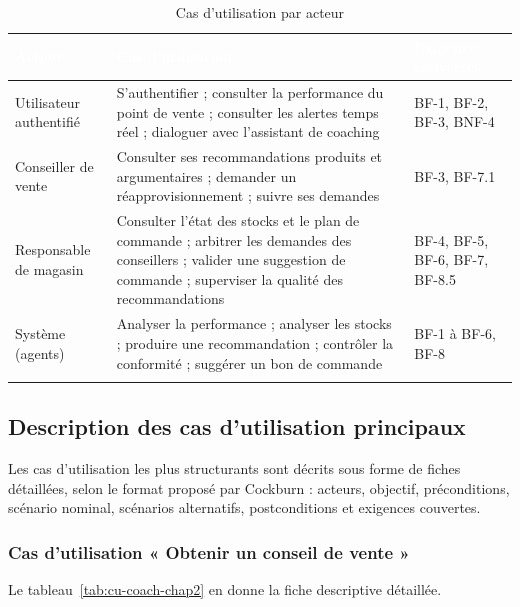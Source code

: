 \begin{longtable}{|P{3.2cm}|P{5.4cm}|P{5.4cm}|}
\hline
{}
\textcolor{white}{\textbf{Acteur}} &
\textcolor{white}{\textbf{Cas d'utilisation}} &
\textcolor{white}{\textbf{Exigences couvertes}} \\
\hline
\endhead
\hline
\endfoot
\hline
\endlastfoot
Utilisateur authentifié &
S'authentifier ; consulter la performance du point de vente ; consulter les alertes temps réel ; dialoguer avec l'assistant de coaching &
BF-1, BF-2, BF-3, BNF-4 \\
\hline
Conseiller de vente &
Consulter ses recommandations produits et argumentaires ; demander un réapprovisionnement ; suivre ses demandes &
BF-3, BF-7.1 \\
\hline
Responsable de magasin &
Consulter l'état des stocks et le plan de commande ; arbitrer les demandes des conseillers ; valider une suggestion de commande ; superviser la qualité des recommandations &
BF-4, BF-5, BF-6, BF-7, BF-8.5 \\
\hline
Système (agents) &
Analyser la performance ; analyser les stocks ; produire une recommandation ; contrôler la conformité ; suggérer un bon de commande &
BF-1 à BF-6, BF-8 \\
\hline
\caption{Cas d'utilisation par acteur}
\label{tab:cas-utilisation-chap2}
\end{longtable}

\subsection{Description des cas d'utilisation principaux}

Les cas d'utilisation les plus structurants sont décrits sous forme de fiches détaillées, selon le format proposé par Cockburn \cite{cockburn2001usecases} : acteurs, objectif, préconditions, scénario nominal, scénarios alternatifs, postconditions et exigences couvertes.

\subsubsection{Cas d'utilisation « Obtenir un conseil de vente »}

Le tableau~\ref{tab:cu-coach-chap2} en donne la fiche descriptive détaillée.

